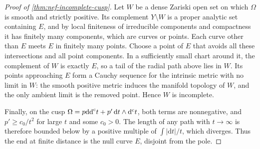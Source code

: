 \begin{proof}[Proof of \cref{thm:nef-incomplete-cusp}]
Let $W$ be a dense Zariski open set on which $\Omega$ is smooth and strictly positive. Its complement $Y\setminus W$ is a proper analytic set containing $E$, and by local finiteness of irreducible components and compactness it has finitely many components, which are curves or points. Each curve other than $E$ meets $E$ in finitely many points. Choose a point of $E$ that avoids all these intersections and all point components. In a sufficiently small chart around it, the complement of $W$ is exactly $E$, so a tail of the radial path above lies in $W$. Its points approaching $E$ form a Cauchy sequence for the intrinsic metric with no limit in $W$: the smooth positive metric induces the manifold topology of $W$, and the only ambient limit is the removed point. Hence $W$ is incomplete.

Finally, on the cusp $\Omega=p\mathrm{dd}^{\mathrm{c}} t+p'\,\mathrm{d}t\wedge\mathrm d^{\mathrm c} t$, both terms are nonnegative, and $p'\geq c_0/t^2$ for large $t$ and some $c_0>0$. The length of any path with $t\to\infty$ is therefore bounded below by a positive multiple of $\int|\mathrm{d}t|/t$, which diverges. Thus the end at finite distance is the null curve $E$, disjoint from the pole.
\end{proof}
